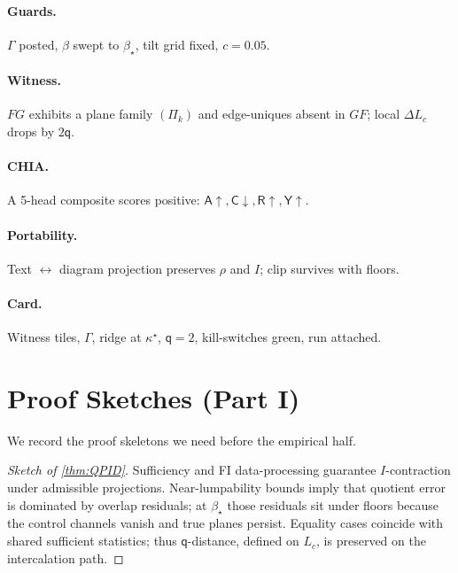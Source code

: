 \documentclass[11pt]{article}
\newcommand{\1}{\mathbf{1}}
\newcommand{\Guard}{\Gamma}
\newcommand{\ratio}{\rho}
\newcommand{\rate}{I}
\newcommand{\Blur}{\beta}
\newcommand{\Lc}{L_c}
\newcommand{\Fop}{F}
\newcommand{\Gop}{G}
\newcommand{\FG}{\Fop\Gop}
\newcommand{\GF}{\Gop\Fop}
\newcommand{\Aplane}{\Pi}
\newcommand{\Qualon}{\mathsf{q}}        %
\newcommand{\CHIA}{\textsc{CHIA}}
\newcommand{\Align}{\mathsf{A}}
\newcommand{\Compat}{\mathsf{C}}
\newcommand{\Rare}{\mathsf{R}}
\newcommand{\Yield}{\mathsf{Y}}
\begin{document}
\paragraph{Guards.} \(\Guard\) posted, \(\Blur\) swept to \(\Blur_\star\), tilt grid fixed, \(c=0.05\).

\paragraph{Witness.} \(\FG\) exhibits a plane family \((\Aplane_k)\) and edge-uniques absent in \(\GF\); local \(\Delta \Lc\) drops by \(2\Qualon\).

\paragraph{\CHIA.} A 5-head composite scores positive: \(\Align\uparrow,\Compat\downarrow,\Rare\uparrow,\Yield\uparrow\). 

\paragraph{Portability.} Text \(\leftrightarrow\) diagram projection preserves \(\ratio\) and \(\rate\); clip survives with floors. 

\paragraph{Card.} Witness tiles, \(\Guard\), ridge at \(\kappa^\star\), \(\Qualon=2\), kill-switches green, run attached.

\section{Proof Sketches (Part I)}
We record the proof skeletons we need before the empirical half.

\begin{proof}[Sketch of \cref{thm:QPID}]
Sufficiency and FI data-processing guarantee \(\rate\)-contraction under admissible projections. Near-lumpability bounds imply that quotient error is dominated by overlap residuals; at \(\Blur_\star\) those residuals sit under floors because the control channels vanish and true planes persist. Equality cases coincide with shared sufficient statistics; thus \(\Qualon\)-distance, defined on \(\Lc\), is preserved on the intercalation path.
\end{proof}
\end{document}
